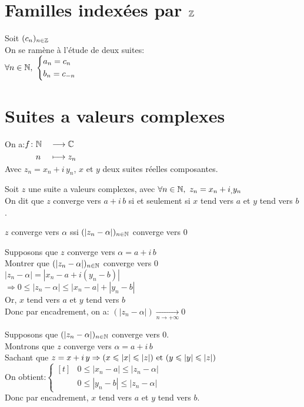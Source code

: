 \documentclass[12pt,twoside,a4paper]{article}
\author{MPSI 2}
\begin{document}
	\maketitle
	\section{Familles index\'ees par $\mathbb{Z}$}
		Soit $(c_n)_{n\in\mathbb{Z}}$\\
		On se ram\`ene \`a l'\'etude de deux suites:\\
		$\forall n\in\N,\ \systeme{&a_n=c_n\\&b_n=c_{-n}}$
	\section{Suites a valeurs complexes}
		On a:$\begin{aligned}[t]f\colon&\mathbb{N}&&\longrightarrow\mathbb{C} \\&n&&\longmapsto z_n\end{aligned}$\\
		Avec $z_n=x_n+i\,y_n$, $x$ et $y$ deux suites r\'eelles composantes.
		\begin{defi}
			Soit $z$ une suite a valeurs complexes, avec $\forall n\in\mathbb{N},\ z_n=x_n+i_,y_n$\\
			On dit que $z$ converge vers $a+i\,b$ si et seulement si $x$ tend vers $a$ et $y$ tend vers $b$.
		\end{defi}
		\begin{prop}
			$z$ converge vers $\alpha$ ssi $(|z_n-\alpha|)_{n\in\mathbb{N}}$ converge vers $0$
		\end{prop}
		\begin{preuve}
			\begin{liste}
				\item[\cercle1]Supposons que $z$ converge vers $\alpha=a+i\,b$\\
					Montrer que $(|z_n-\alpha|)_{n\in\mathbb{N}}$ converge vers $0$\\
					$|z_n-\alpha|=|x_n-a+i(y_n-b)|$\\
					$\Rightarrow0\leqslant|z_n-\alpha|\leqslant|x_n-a|+|y_n-b|$\\
					Or, $x$ tend vers $a$ et $y$ tend vers $b$\\
					Donc par encadrement, on a: $(|z_n-\alpha|)\mathop{\longrightarrow}\limits_{n\rightarrow+\infty}0$
				\item[\cercle2]Supposons que $(|z_n-\alpha|)_{n\in\mathbb{N}}$ converge vers $0$.\\
					Montrons que $z$ converge vers $\alpha=a+i\,b$\\
					Sachant que $z=x+i\,y\Rightarrow(x\leqslant|x|\leqslant|z|)\text{ et }(y\leqslant|y|\leqslant|z|)$\\
					On obtient:$\left\{\begin{aligned}[t]
						& 0\leqslant|x_n-a|\leqslant|z_n-\alpha|\\
						& 0\leqslant|y_n-b|\leqslant|z_n-\alpha|
					\end{aligned}\right.$\\
					Donc par encadrement, $x$ tend vers $a$ et $y$ tend vers $b$.
			\end{liste}
		\end{preuve}
\end{document}
